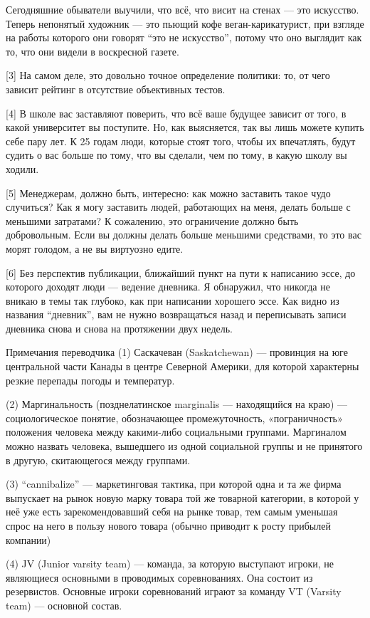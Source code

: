 \documentclass[ebook,12pt,oneside,openany]{memoir}
\begin{document}
Сегодняшние обыватели выучили, что всё, что висит на стенах — это
искусство. Теперь непонятый художник — это пьющий кофе
веган-карикатурист, при взгляде на работы которого они говорят “это не
искусство”, потому что оно выглядит как то, что они видели в
воскресной газете.

[3] На самом деле, это довольно точное определение политики: то, от
чего зависит рейтинг в отсутствие объективных тестов.

[4] В школе вас заставляют поверить, что всё ваше будущее зависит от
того, в какой университет вы поступите. Но, как выясняется, так вы
лишь можете купить себе пару лет. К 25 годам люди, которые стоят того,
чтобы их впечатлять, будут судить о вас больше по тому, что вы
сделали, чем по тому, в какую школу вы ходили.

[5] Менеджерам, должно быть, интересно: как можно заставить такое чудо
случиться? Как я могу заставить людей, работающих на меня, делать
больше с меньшими затратами? К сожалению, это ограничение должно быть
добровольным. Если вы должны делать больше меньшими средствами, то это
вас морят голодом, а не вы виртуозно едите.

[6] Без перспектив публикации, ближайший пункт на пути к написанию
эссе, до которого доходят люди — ведение дневника. Я обнаружил, что
никогда не вникаю в темы так глубоко, как при написании хорошего эссе.
Как видно из названия “дневник”, вам не нужно возвращаться назад и
переписывать записи дневника снова и снова на протяжении двух недель.

Примечания переводчика (1) Саскачеван (Saskatchewan) — провинция на
юге центральной части Канады в центре Северной Америки, для которой
характерны резкие перепады погоды и температур.

(2) Маргинальность (позднелатинское marginalis — находящийся на краю)
— социологическое понятие, обозначающее промежуточность,
«пограничность» положения человека между какими-либо социальными
группами. Маргиналом можно назвать человека, вышедшего из одной
социальной группы и не принятого в другую, скитающегося между
группами.

(3) “cannibalize” — маркетинговая тактика, при которой одна и та же
фирма выпускает на рынок новую марку товара той же товарной категории,
в которой у неё уже есть зарекомендовавший себя на рынке товар, тем
самым уменьшая спрос на него в пользу нового товара (обычно приводит к
росту прибылей компании)

(4) JV (Junior varsity team) — команда, за которую выступают игроки,
не являющиеся основными в проводимых соревнованиях. Она состоит из
резервистов. Основные игроки соревнований играют за команду VT
(Varsity team) — основной состав.
\end{document}
